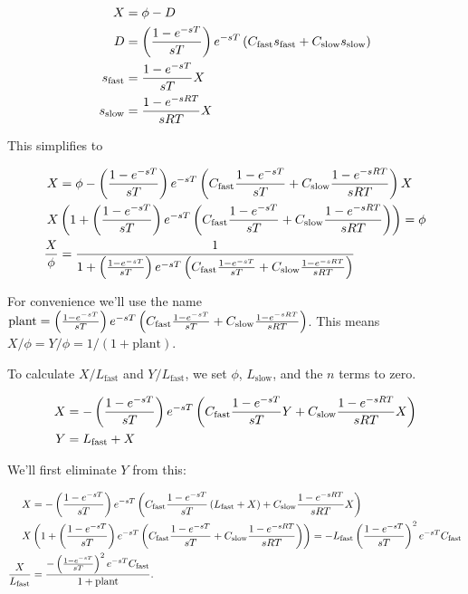 \documentclass{article}
\begin{document}
    \begin{align*}
        X &= \phi - D \\
        D &= \left(\frac{1 - e^{-sT}}{sT}\right) e^{-sT} \left(C_{\text{fast}} s_{\text{fast}} + C_{\text{slow}} s_{\text{slow}}\right) \\
        s_{\text{fast}} &= \frac{1 - e^{-sT}}{sT} X \\
        s_{\text{slow}} &= \frac{1 - e^{-sRT}}{sRT} X \\
    \end{align*}

    This simplifies to

    \begin{align*}
        X &= \phi - \left(\frac{1 - e^{-sT}}{sT}\right) e^{-sT} \left(C_{\text{fast}} \frac{1 - e^{-sT}}{sT} + C_{\text{slow}} \frac{1 - e^{-sRT}}{sRT}\right) X\\
        X &\left(1 + \left(\frac{1 - e^{-sT}}{sT}\right) e^{-sT} \left(C_{\text{fast}} \frac{1 - e^{-sT}}{sT} + C_{\text{slow}} \frac{1 - e^{-sRT}}{sRT}\right) \right) = \phi\\
        \frac{X}{\phi} &= \frac{1}{1 + \left(\frac{1 - e^{-sT}}{sT}\right) e^{-sT} \left(C_{\text{fast}} \frac{1 - e^{-sT}}{sT} + C_{\text{slow}} \frac{1 - e^{-sRT}}{sRT}\right)}\\
    \end{align*}

    For convenience we'll use the name $\text{plant} = \left(\frac{1 - e^{-sT}}{sT}\right) e^{-sT} \left(C_{\text{fast}} \frac{1 - e^{-sT}}{sT} + C_{\text{slow}} \frac{1 - e^{-sRT}}{sRT}\right)$. This means $X/\phi = Y/\phi = 1 / (1 + \text{plant})$.

    To calculate $X/L_{\text{fast}}$ and $Y/L_{\text{fast}}$, we set $\phi$, $L_{\text{slow}}$, and the $n$ terms to zero.

    \begin{align*}
        X &= -\left(\frac{1 - e^{-sT}}{sT}\right) e^{-sT} \left(C_{\text{fast}} \frac{1 - e^{-sT}}{sT} Y + C_{\text{slow}} \frac{1 - e^{-sRT}}{sRT} X\right) \\
        Y &= L_{\text{fast}} + X \\
    \end{align*}

    We'll first eliminate $Y$ from this:

    \begin{align*}
        X &= -\left(\frac{1 - e^{-sT}}{sT}\right) e^{-sT} \left(C_{\text{fast}} \frac{1 - e^{-sT}}{sT} \left(L_{\text{fast}} + X\right) + C_{\text{slow}} \frac{1 - e^{-sRT}}{sRT} X\right) \\
        X & \left(1 + \left(\frac{1 - e^{-sT}}{sT}\right) e^{-sT} \left(C_{\text{fast}} \frac{1 - e^{-sT}}{sT} + C_{\text{slow}} \frac{1 - e^{-sRT}}{sRT}\right)\right) = -L_{\text{fast}} \left(\frac{1 - e^{-sT}}{sT}\right)^2 e^{-sT} C_{\text{fast}}\\
        \frac{X}{L_{\text{fast}}} &= \frac{-\left(\frac{1 - e^{-sT}}{sT}\right)^2 e^{-sT} C_{\text{fast}}}{1 + \text{plant}}.
    \end{align*}
\end{document}
